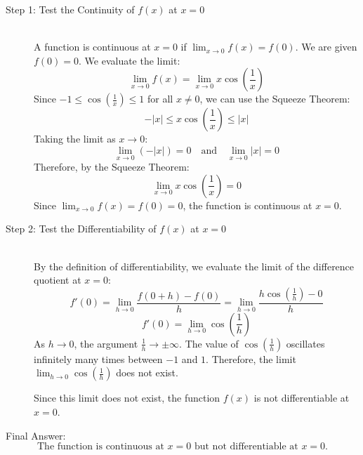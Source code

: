 \documentclass[11pt, a4paper]{article}
\begin{document}
\begin{description}
    \item[Step 1: Test the Continuity of $f(x)$ at $x = 0$] \ \\
    A function is continuous at $x = 0$ if $\lim_{x \to 0} f(x) = f(0)$.
    We are given $f(0) = 0$.
    We evaluate the limit:
    \[ \lim_{x \to 0} f(x) = \lim_{x \to 0} x \cos\left(\frac{1}{x}\right) \]
    Since $-1 \le \cos\left(\frac{1}{x}\right) \le 1$ for all $x \neq 0$, we can use the Squeeze Theorem:
    \[ -|x| \le x \cos\left(\frac{1}{x}\right) \le |x| \]
    Taking the limit as $x \to 0$:
    \[ \lim_{x \to 0} (-|x|) = 0 \quad \text{and} \quad \lim_{x \to 0} |x| = 0 \]
    Therefore, by the Squeeze Theorem:
    \[ \lim_{x \to 0} x \cos\left(\frac{1}{x}\right) = 0 \]
    Since $\lim_{x \to 0} f(x) = f(0) = 0$, the function is continuous at $x = 0$.

    \item[Step 2: Test the Differentiability of $f(x)$ at $x = 0$] \ \\
    By the definition of differentiability, we evaluate the limit of the difference quotient at $x=0$:
    \[ f'(0) = \lim_{h \to 0} \frac{f(0+h) - f(0)}{h} = \lim_{h \to 0} \frac{h \cos\left(\frac{1}{h}\right) - 0}{h} \]
    \[ f'(0) = \lim_{h \to 0} \cos\left(\frac{1}{h}\right) \]
    As $h \to 0$, the argument $\frac{1}{h} \to \pm \infty$. The value of $\cos\left(\frac{1}{h}\right)$ oscillates infinitely many times between $-1$ and $1$.
    Therefore, the limit $\lim_{h \to 0} \cos\left(\frac{1}{h}\right)$ does not exist.
    
    Since this limit does not exist, the function $f(x)$ is not differentiable at $x = 0$.
\end{description}

Final Answer:
\[ 
\boxed{\text{The function is continuous at } x=0 \text{ but not differentiable at } x=0.} 
\]


\end{document}
